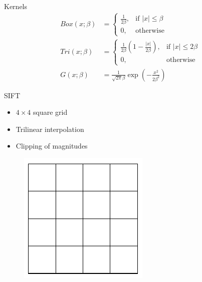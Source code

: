 \documentclass[14pt,t]{beamer}
\begin{document}
\begin{frame}{Kernels}
\ghostframe
\setlength{\jot}{15pt}
\begin{align*}
\mathit{Box} (x; \beta) &= 
\begin{cases}
    \frac{1}{2 \beta},& \text{if } |x| \leq \beta \\
    0,              & \text{otherwise}
\end{cases} \\
\mathit{Tri} (x; \beta) &= 
\begin{cases}
    \frac{1}{2 \beta} \left( 1 - \frac{| x |}{2 \beta} \right) ,& \text{if } |x| \leq 2 \beta \\
    0,              & \text{otherwise}
\end{cases} \\
G(x;\beta) &= \frac{1}{\sqrt{2\pi} \beta}
\exp\left( -\frac{x^2}{2 \beta^2} \right)
\end{align*}
\end{frame}
%
\begin{frame}{SIFT \cite{lowe2004distinctive}}
\ghostframe
\begin{minipage}[t]{0.7\textwidth}
	\begin{itemize}
	\item $4 \times 4$ square grid
	\item Trilinear interpolation
	\item Clipping of magnitudes
	\end{itemize}
\end{minipage}
\begin{minipage}[t]{0.25\textwidth}
	\begin{figure}
		\includegraphics[width=\textwidth]{../report/img/siftGrid.pdf}
	\end{figure}
\end{minipage}
\end{frame}
\end{document}
